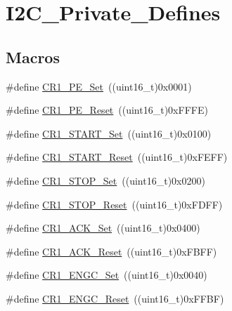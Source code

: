 \hypertarget{group___i2_c___private___defines}{}\section{I2\+C\+\_\+\+Private\+\_\+\+Defines}
\label{group___i2_c___private___defines}
\subsection*{Macros}
\begin{DoxyCompactItemize}
\item 
\#define \mbox{\hyperlink{group___i2_c___private___defines_ga913b708338087f3ffc2fba2b05a38917}{C\+R1\+\_\+\+P\+E\+\_\+\+Set}}~((uint16\+\_\+t)0x0001)
\item 
\#define \mbox{\hyperlink{group___i2_c___private___defines_ga21dc289f16c502a2bc0a88e1514a8ee0}{C\+R1\+\_\+\+P\+E\+\_\+\+Reset}}~((uint16\+\_\+t)0x\+F\+F\+F\+E)
\item 
\#define \mbox{\hyperlink{group___i2_c___private___defines_ga53820dd338da9779d039718148184ef9}{C\+R1\+\_\+\+S\+T\+A\+R\+T\+\_\+\+Set}}~((uint16\+\_\+t)0x0100)
\item 
\#define \mbox{\hyperlink{group___i2_c___private___defines_gacc62242e31a380aec2ef9f836b3cf19d}{C\+R1\+\_\+\+S\+T\+A\+R\+T\+\_\+\+Reset}}~((uint16\+\_\+t)0x\+F\+E\+F\+F)
\item 
\#define \mbox{\hyperlink{group___i2_c___private___defines_gac14ffc5548d2c30d21c49612c57e52be}{C\+R1\+\_\+\+S\+T\+O\+P\+\_\+\+Set}}~((uint16\+\_\+t)0x0200)
\item 
\#define \mbox{\hyperlink{group___i2_c___private___defines_gac44124bc7b468c7dee8188712e407e02}{C\+R1\+\_\+\+S\+T\+O\+P\+\_\+\+Reset}}~((uint16\+\_\+t)0x\+F\+D\+F\+F)
\item 
\#define \mbox{\hyperlink{group___i2_c___private___defines_ga1f74487a0fbffdcd8a4c440c732dc316}{C\+R1\+\_\+\+A\+C\+K\+\_\+\+Set}}~((uint16\+\_\+t)0x0400)
\item 
\#define \mbox{\hyperlink{group___i2_c___private___defines_gaa8bcbe2f6089d896aff8e7770368aada}{C\+R1\+\_\+\+A\+C\+K\+\_\+\+Reset}}~((uint16\+\_\+t)0x\+F\+B\+F\+F)
\item 
\#define \mbox{\hyperlink{group___i2_c___private___defines_gadcd99a681046a2315f4bc72c9f461f0e}{C\+R1\+\_\+\+E\+N\+G\+C\+\_\+\+Set}}~((uint16\+\_\+t)0x0040)
\item 
\#define \mbox{\hyperlink{group___i2_c___private___defines_gab51161052b055a5eecb0aad447a776e5}{C\+R1\+\_\+\+E\+N\+G\+C\+\_\+\+Reset}}~((uint16\+\_\+t)0x\+F\+F\+B\+F)

\end{DoxyCompactItemize}
